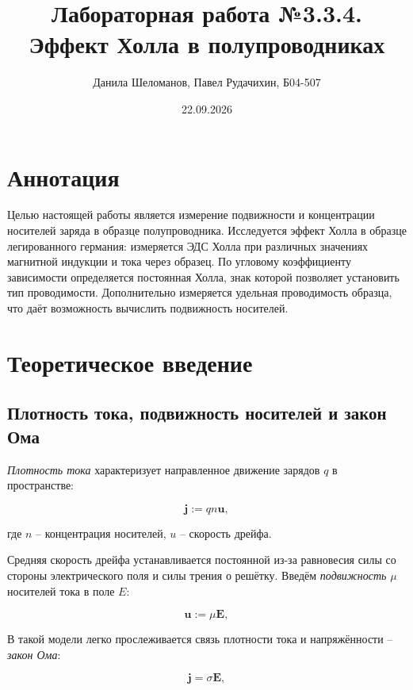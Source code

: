 \documentclass{article}
\title{Лабораторная работа №3.3.4. \\ \textbf{Эффект Холла в полупроводниках}}
\author{Данила Шеломанов, Павел Рудачихин, Б04-507}
\date{22.09.2026}
\begin{document}
\maketitle{}

\section {Аннотация} 

	\hspace{4mm} Целью настоящей работы является измерение подвижности и концентрации носителей заряда в образце полупроводника. Исследуется эффект Холла в образце легированного германия: измеряется ЭДС Холла при различных значениях магнитной индукции и тока через образец. По угловому коэффициенту зависимости определяется постоянная Холла, знак которой позволяет установить тип проводимости. Дополнительно измеряется удельная проводимость образца, что даёт возможность вычислить подвижность носителей.
	

\section {Теоретическое введение}

	\subsection{Плотность тока, подвижность носителей и закон Ома}
	
		\hspace{4mm} \textit{Плотность тока} характеризует направленное движение зарядов $q$ в пространстве:
		
		\begin{equation}
			\textbf{j} := qn\textbf{u},
		\end{equation}
		
		где $n$ -- концентрация носителей, $u$ -- скорость дрейфа.
		
		Средняя скорость дрейфа устанавливается постоянной из-за равновесия силы со стороны электрического поля и силы трения о решётку. Введём \textit{подвижность} $\mu$ носителей тока в поле $E$:
		
		\begin{equation}
			\textbf{u} := \mu \textbf{E},
		\end{equation}
		
		В такой модели легко прослеживается связь плотности тока и напряжённости -- \textit{закон Ома}:
		
		\begin{equation}
			\textbf{j} =\sigma\textbf{E}, 
		\end{equation}
		
\end{document}
